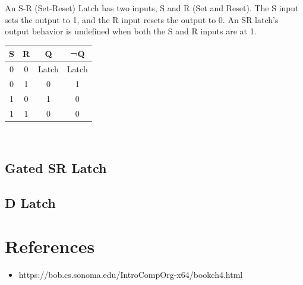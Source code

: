 An S-R (Set-Reset) Latch has two inputs, S and R (Set and Reset). The S input sets the output to 1, and the R input resets the output to 0. An SR latch's output behavior is undefined when both the S and R inputs are at 1. \\

\begin{tabular}{c c c c}
	\hline
	\textbf{S} & \textbf{R} & \textbf{Q} & \textbf{¬Q} \\ 
	\hline
	0 & 0 & Latch & Latch\\
	0 & 1 & 0 & 1\\
	1 & 0 & 1 & 0 \\
	1 & 1 & 0 & 0 \\
	\hline 
\end{tabular} \\

\subsection{Gated SR Latch}

\subsection{D Latch}

\section{References}

\begin{itemize}
	\item https://bob.cs.sonoma.edu/IntroCompOrg-x64/bookch4.html
\end{itemize}